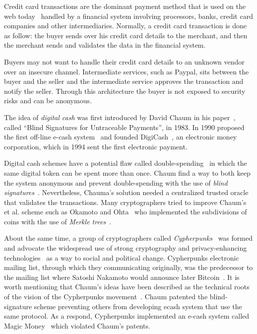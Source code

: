 Credit card transactions are the dominant payment method that is used on the web today~\cite{Narayanan:2016:BCT:2994437} handled by a financial
system involving processors, banks, credit card companies and other intermediaries. Normally, a credit card transaction is done as follow:
the buyer sends over his credit card details to the merchant, and then the merchant sends and validates the data in the financial system.

Buyers may not want to handle their credit card details to an unknown vendor over an insecure channel. Intermediate services, such as Paypal, sits between the buyer and the seller and the intermediate service approves
the transaction and notify the seller. Through this architecture the buyer is not exposed to security risks and can be anonymous.

The idea of \textit{digital cash} was first introduced by David Chaum in his paper~\cite{Chaum1983}, called ``Blind Signatures for Untraceable Payments'', in 1983. In 1990 proposed the first off-line e-cash system~\cite{Chaum:1988:UEC:646753.704915} and founded DigiCash~\cite{chaum1983blind}, an electronic money corporation,
which in 1994 sent the first electronic payment.

Digital cash schemes have a potential flaw called double-spending~\cite{10.1007/978-3-662-46803-6_10, 7163021} in which the same digital token can be spent more than once.
Chaum find a way to both keep the system anonymous and prevent double-spending with the use of \textit{blind signatures}~\cite{Chaum1983,Chaum:1988:UEC:646753.704915}.
Nevertheless, Chauma's solution needed a centralized trusted oracle that validates the transactions. Many cryptographers tried to improve Chaum's et al. scheme such as Okamoto and Ohta~\cite{Watanabe1996} who implemented the subdivisions of coins with the use of \textit{Merkle trees}~\cite{merkle_tree}.

About the same time, a group of cryptographers called \textit{Cypherpunks}~\cite{cypherpunk,cypherpunks_manifesto} was formed and advocate the widespread
use of strong cryptography and privacy-enhancing technologies~\cite{cypherpunks_manifesto} as a way to social and political change. Cypherpunks electronic mailing list,
through which they communicating originally, was the predecessor to the mailing list where Satoshi Nakamoto would announce later Bitcoin~\cite{nakamoto2012bitcoin}. It is worth mentioning that Chaum's ideas have been described as the technical roots of the vision of the Cypherpunks movement~\cite{cypherpunk}. Chaum patented the blind-signature scheme preventing others from developing ecash system that use the same protocol. As a respond, Cypherpunks implemented an e-cash system called Magic Money~\cite{magic_money} which violated Chaum's patents.

